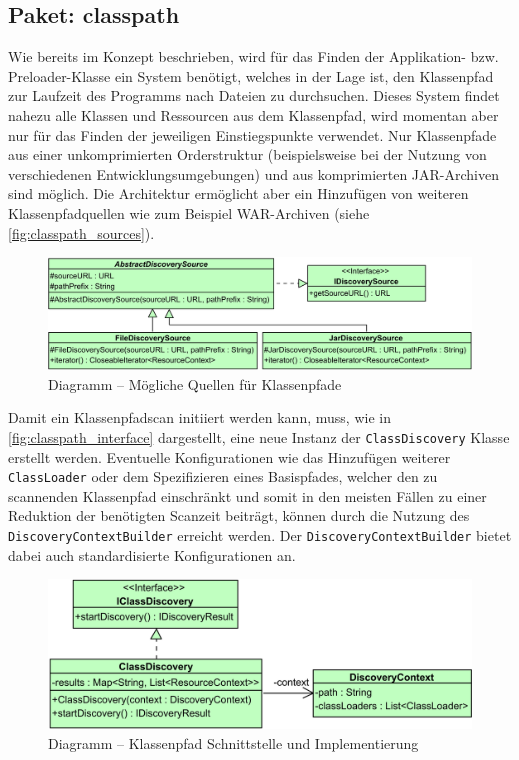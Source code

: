 \subsection{Paket: classpath}
Wie bereits im Konzept beschrieben, wird für das Finden der Applikation- bzw. Preloader-Klasse ein System benötigt, welches in der Lage ist, den Klassenpfad zur Laufzeit des Programms nach Dateien zu durchsuchen. Dieses System findet nahezu alle Klassen und Ressourcen aus dem Klassenpfad, wird momentan aber nur für das Finden der jeweiligen Einstiegspunkte verwendet. Nur Klassenpfade aus einer unkomprimierten Orderstruktur (beispielsweise bei der Nutzung von verschiedenen Entwicklungsumgebungen) und aus komprimierten JAR-Archiven sind möglich. Die Architektur ermöglicht aber ein Hinzufügen von weiteren Klassenpfadquellen wie zum Beispiel WAR-Archiven (siehe \autoref{fig:classpath_sources}). 
\begin{figure}[H]
	\centering
	\includegraphics[width=\textwidth-2cm]{Abbildungen/Klassenpfadscan-Sources.png}
	\caption{Diagramm -- Mögliche Quellen für Klassenpfade}
	\label{fig:classpath_sources}
\end{figure}
\noindent Damit ein Klassenpfadscan initiiert werden kann, muss, wie in \autoref{fig:classpath_interface} dargestellt, eine neue Instanz der \texttt{ClassDiscovery} Klasse erstellt werden. Eventuelle Konfigurationen wie das Hinzufügen weiterer \texttt{ClassLoader} oder dem Spezifizieren eines Basispfades, welcher den zu scannenden Klassenpfad einschränkt und somit in den meisten Fällen zu einer Reduktion der benötigten Scanzeit beiträgt, können durch die Nutzung des \texttt{DiscoveryContextBuilder} erreicht werden. Der \texttt{DiscoveryContextBuilder} bietet dabei auch standardisierte Konfigurationen an.
\begin{figure}[H]
	\centering
	\includegraphics[width=\textwidth-2cm]{Abbildungen/Klassenpfadscan-Discovery.png}
	\caption{Diagramm -- Klassenpfad Schnittstelle und Implementierung}
	\label{fig:classpath_interface}
\end{figure}
